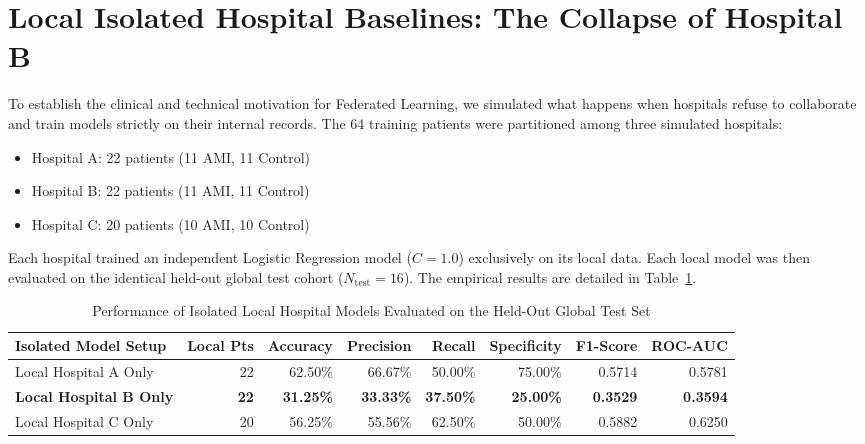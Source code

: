 \section{Local Isolated Hospital Baselines: The Collapse of Hospital B}
\label{sec:local_baselines}

To establish the clinical and technical motivation for Federated Learning, we simulated what happens when hospitals refuse to collaborate and train models strictly on their internal records. The 64 training patients were partitioned among three simulated hospitals:
\begin{itemize}
    \item Hospital A: 22 patients (11 AMI, 11 Control)
    \item Hospital B: 22 patients (11 AMI, 11 Control)
    \item Hospital C: 20 patients (10 AMI, 10 Control)
\end{itemize}

Each hospital trained an independent Logistic Regression model ($C=1.0$) exclusively on its local data. Each local model was then evaluated on the identical held-out global test cohort ($N_{\text{test}} = 16$). The empirical results are detailed in Table~\ref{tab:local_metrics}.

\begin{table}[htbp]
\centering
\caption{Performance of Isolated Local Hospital Models Evaluated on the Held-Out Global Test Set}
\label{tab:local_metrics}
\begin{tabular}{@{}lrrrrrrr@{}}
\toprule
\textbf{Isolated Model Setup} & \textbf{Local Pts} & \textbf{Accuracy} & \textbf{Precision} & \textbf{Recall} & \textbf{Specificity} & \textbf{F1-Score} & \textbf{ROC-AUC} \\ \midrule
Local Hospital A Only & 22 & 62.50\% & 66.67\% & 50.00\% & 75.00\% & 0.5714 & 0.5781 \\
\textbf{Local Hospital B Only} & \textbf{22} & \textbf{31.25\%} & \textbf{33.33\%} & \textbf{37.50\%} & \textbf{25.00\%} & \textbf{0.3529} & \textbf{0.3594} \\
Local Hospital C Only & 20 & 56.25\% & 55.56\% & 62.50\% & 50.00\% & 0.5882 & 0.6250 \\ \bottomrule
\end{tabular}
\end{table}

